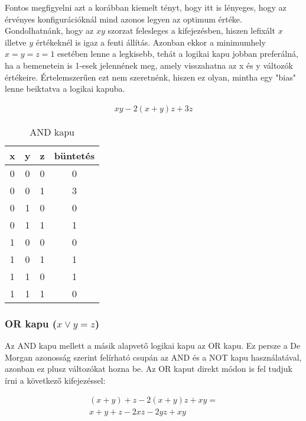 Fontos megfigyelni azt a korábban kiemelt tényt, hogy itt is lényeges, hogy az érvényes konfigurációknál mind azonos legyen az optimum értéke. Gondolhatnánk, hogy az $xy$ szorzat felesleges a kifejezésben, hiszen lefixált $x$ illetve $y$ értékeknél is igaz a fenti állítás. Azonban ekkor a minimumhely $x=y=z=1$ esetében lenne a legkisebb, tehát a logikai kapu jobban preferálná, ha a bemenetein is 1-esek jelennének meg, amely visszahatna az x és y változók értékeire. Értelemszerűen ezt nem szeretnénk, hiszen ez olyan, mintha egy "bias" lenne beiktatva a logikai kapuba.



\begin{align}
	xy-2(x+y)z+3z
\end{align}

\begin{table}[ht]
	\footnotesize
	\centering
	\begin{tabular}{ c c c c }
		\toprule
		x & y & z & büntetés \\
		\midrule
		0 & 0 & 0 & 0 \\
		0 & 0 & 1 & 3 \\
		0 & 1 & 0 & 0 \\
		0 & 1 & 1 & 1 \\
		1 & 0 & 0 & 0 \\
		1 & 0 & 1 & 1 \\
		1 & 1 & 0 & 1 \\
		1 & 1 & 1 & 0 \\		
		\bottomrule
	\end{tabular}
	\caption{AND kapu}
	\label{tab:ANDgate}
\end{table}

\subsubsection{OR kapu ($x \vee y = z$)}

Az AND kapu mellett a másik alapvető logikai kapu az OR kapu. Ez persze a De Morgan azonosság szerint felírható csupán az AND és a NOT kapu használatával, azonban ez plusz változókat hozna be. Az OR kaput direkt módon is fel tudjuk írni a következő kifejezéssel: 

\begin{align}
	(x+y)+z-2(x+y)z+xy = \\
	x+y+z-2xz-2yz+xy
\end{align}

